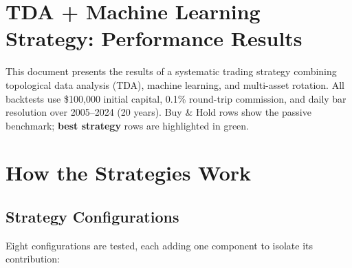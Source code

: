 \documentclass[11pt]{article}
\begin{document}
\section*{TDA + Machine Learning Strategy: Performance Results}
\noindent This document presents the results of a systematic trading strategy combining topological data analysis (TDA), machine learning, and multi-asset rotation. All backtests use \$100{,}000 initial capital, 0.1\% round-trip commission, and daily bar resolution over 2005--2024 (20 years).
\colorbox{benchbg}{Buy \& Hold} rows show the passive benchmark; \colorbox{bestbg}{\textbf{best strategy}} rows are highlighted in green.

\section*{How the Strategies Work}

\subsection*{Strategy Configurations}

Eight configurations are tested, each adding one component to isolate its contribution:
\end{document}
